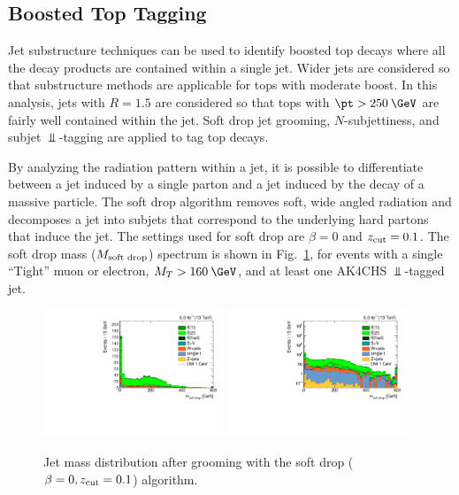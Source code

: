 \subsection{Boosted Top Tagging}
\label{subsec:sel_toptag_boosted}

Jet substructure techniques can be used to identify boosted top decays where all the decay products are contained within a single jet. Wider jets are considered so that substructure methods are applicable for tops with moderate boost. In this analysis, jets with $R=1.5$ are considered so that tops with $\pt>250\:\GeV$ are fairly well contained within the jet. Soft drop jet grooming, $N$-subjettiness, and subjet $\Bot$-tagging are applied to tag top decays.

By analyzing the radiation pattern within a jet, it is possible to differentiate between a jet induced by a single parton and a jet induced by the decay of a massive particle. The soft drop algorithm removes soft, wide angled radiation and decomposes a jet into subjets that correspond to the underlying hard partons that induce the jet. The settings used for soft drop are $\beta=0$ and $z_{\mbox{\scriptsize{cut}}}=0.1$. The soft drop mass ($M_{\mbox{\scriptsize{soft drop}}}$) spectrum is shown in Fig.~\ref{fig:softdrop}, for events with a single ``Tight'' muon or electron, $M_T>160\:\GeV$, and at least one AK4CHS $\Bot$-tagged jet.

\begin{figure}[htbp]
  \centering
  \includegraphics[width=0.48\textwidth]{figures/softdrop.pdf}
  \includegraphics[width=0.48\textwidth]{figures/softdroplog.pdf}
  \caption{Jet mass distribution after grooming with the soft drop ($\beta=0, z_{\mbox{\scriptsize{cut}}}=0.1$) algorithm.}
  \label{fig:softdrop}
\end{figure}

